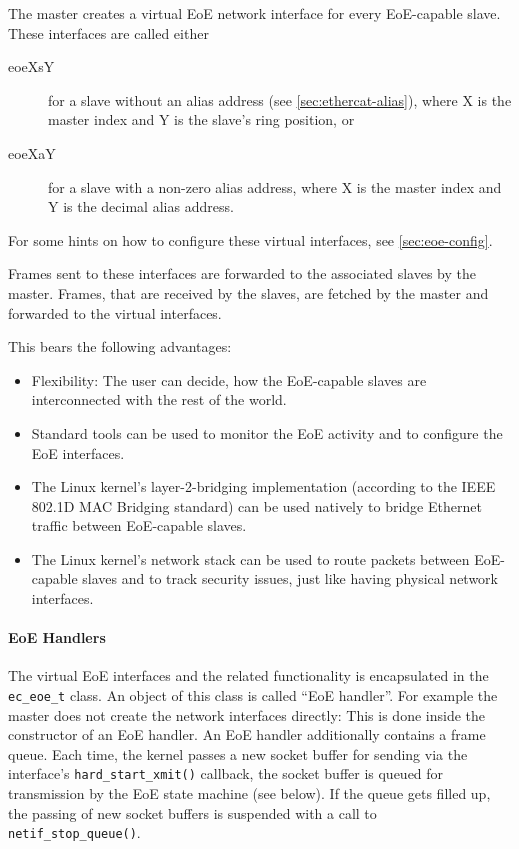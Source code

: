 \documentclass[a4paper,12pt,BCOR=6mm,bibtotoc,idxtotoc]{scrbook}
\begin{document}
The master creates a virtual EoE network interface for every EoE-capable
slave. These interfaces are called either

\begin{description}

\item[eoeXsY] for a slave without an alias address (see
\autoref{sec:ethercat-alias}), where X is the master index and Y is the
slave's ring position, or

\item[eoeXaY] for a slave with a non-zero alias address, where X is the master
index and Y is the decimal alias address.

\end{description}

For some hints on how to configure these virtual interfaces, see
\autoref{sec:eoe-config}.

Frames sent to these interfaces are forwarded to the associated slaves by the
master. Frames, that are received by the slaves, are fetched by the master and
forwarded to the virtual interfaces.

This bears the following advantages:

\begin{itemize}

\item Flexibility: The user can decide, how the EoE-capable slaves are
interconnected with the rest of the world.

\item Standard tools can be used to monitor the EoE activity and to configure
the EoE interfaces.

\item The Linux kernel's layer-2-bridging implementation (according to the
IEEE 802.1D MAC Bridging standard) can be used natively to bridge Ethernet
traffic between EoE-capable slaves.

\item The Linux kernel's network stack can be used to route packets between
EoE-capable slaves and to track security issues, just like having physical
network interfaces.

\end{itemize}

\paragraph{EoE Handlers}

The virtual EoE interfaces and the related functionality is encapsulated in
the \lstinline+ec_eoe_t+ class. An object of this class is called ``EoE
handler''. For example the master does not create the network interfaces
directly: This is done inside the constructor of an EoE handler. An EoE
handler additionally contains a frame queue. Each time, the kernel passes a
new socket buffer for sending via the interface's
\lstinline+hard_start_xmit()+ callback, the socket buffer is queued for
transmission by the EoE state machine (see below). If the queue gets filled
up, the passing of new socket buffers is suspended with a call to
\lstinline+netif_stop_queue()+.
\end{document}
